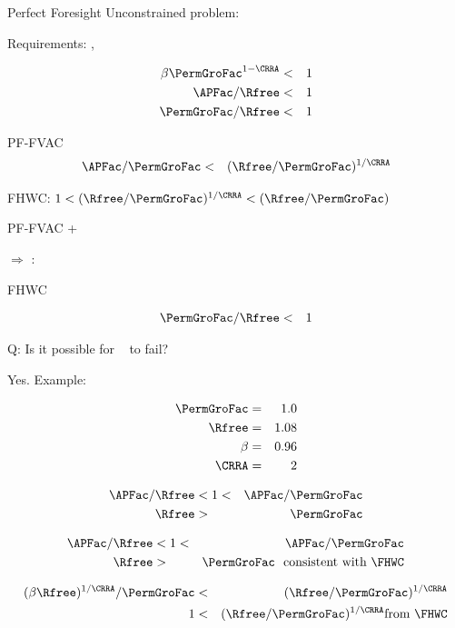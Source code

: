 \documentclass[titlepage,abstract]{bejournal}
\begin{document}
Perfect Foresight Unconstrained problem:

Requirements: \PFFVAC, \FHWC~



\begin{eqnarray}
    \beta \PermGroFac^{1-\CRRA} & < & 1   \label{eq:PFFVAC}
\\  \APFac/\Rfree & < & 1 \label{eq:RIC}
\\  \PermGroFac/\Rfree & < & 1  \label{eq:FHWC}
\end{eqnarray}

PF-FVAC
\begin{eqnarray}
  \APFac/\PermGroFac & < & (\Rfree/\PermGroFac)^{1/\CRRA} \label{eq:RIC}
\end{eqnarray}

FHWC: $1 < (\Rfree/\PermGroFac)^{1/\CRRA} < (\Rfree/\PermGroFac)$

PF-FVAC + \FHWC~


$\Rightarrow$ \RIC:


FHWC~



\begin{eqnarray}
  \PermGroFac/\Rfree & < & 1  \label{eq:PFFVAC}
\end{eqnarray}


Q: Is it possible for \GICMod~
to fail?

Yes.  Example:

\begin{eqnarray}
  \PermGroFac & = & 1.0
\\ \Rfree & = & 1.08
\\ \beta  & = & 0.96
\\ \CRRA & = & 2
\end{eqnarray}



\begin{eqnarray}
  \label{eq:GICModFails}
  \APFac/\Rfree & < 1  < & \APFac/\PermGroFac 
\\ \Rfree & > & \PermGroFac
\end{eqnarray}

\begin{eqnarray}
  \label{eq:GICModFails}
  \APFac/\Rfree & < 1  < & \APFac/\PermGroFac 
\\ \Rfree & > & \PermGroFac \text{~~consistent with \FHWC}
\end{eqnarray}

\begin{eqnarray}
  \label{eq:1}
  (\beta \Rfree)^{1/\CRRA}/\PermGroFac & < & (\Rfree/\PermGroFac)^{1/\CRRA} 
\\ 1 & < &  (\Rfree/\PermGroFac)^{1/\CRRA} \text{from \FHWC}
\end{eqnarray}
\end{document}
